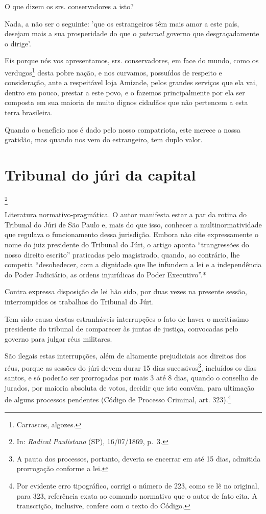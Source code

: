 O que dizem os srs. conservadores a isto?

Nada, a não ser o seguinte: 'que os estrangeiros têm mais amor a este
país, desejam mais a sua prosperidade do que o \emph{paternal} governo
que desgraçadamente o dirige'.

Eis porque nós vos apresentamos, srs. conservadores, em face do mundo,
como os verdugos\footnote{Carrascos, algozes.} desta pobre nação, e
nos curvamos, possuídos de respeito e consideração, ante a respeitável
loja Amizade, pelos grandes serviços que ela vai, dentro em pouco,
prestar a este povo, e o fazemos principalmente por ela ser composta em
sua maioria de muito dignos cidadãos que não pertencem a esta terra
brasileira.

Quando o benefício nos é dado pelo nosso compatriota, este merece a
nossa gratidão, mas quando nos vem do estrangeiro, tem duplo valor.

\chapter{Tribunal do júri da capital}\footnote{In: \emph{Radical Paulistano}
  (SP), 16/07/1869, p.~3.}

\begin{didascalia}
Literatura normativo-pragmática. O autor manifesta estar a par da rotina
do Tribunal do Júri de São Paulo e, mais do que isso, conhecer a
multinormatividade que regulava o funcionamento dessa jurisdição. Embora
não cite expressamente o nome do juiz presidente do Tribunal do Júri, o
artigo aponta ``trangressões do nosso direito escrito'' praticadas pelo
magistrado, quando, ao contrário, lhe competia ``desobedecer, com a
dignidade que lhe infundem a lei e a independência do Poder Judiciário,
as ordens injurídicas do Poder Executivo''.*
\end{didascalia}

\asterisc{}

Contra expressa disposição de lei hão sido, por duas vezes na presente
sessão, interrompidos os trabalhos do Tribunal do Júri.

Tem sido causa destas estranháveis interrupções o fato de haver o
meritíssimo presidente do tribunal de comparecer às juntas de justiça,
convocadas pelo governo para julgar réus militares.

São ilegais estas interrupções, além de altamente prejudiciais aos
direitos dos réus, porque as sessões do júri devem durar 15 dias
sucessivos\footnote{A pauta dos processos, portanto, deveria se
  encerrar em até 15 dias, admitida prorrogação conforme a lei.},
incluídos os dias santos, e só poderão ser prorrogadas por mais 3 até 8
dias, quando o conselho de jurados, por maioria absoluta de votos,
decidir que isto convém, para ultimação de alguns processos pendentes
(Código de Processo Criminal, art. 323).\footnote{Por evidente erro
  tipográfico, corrigi o número de 223, como se lê no original, para
  323, referência exata ao comando normativo que o autor de fato cita. A
  transcrição, inclusive, confere com o texto do Código.}


